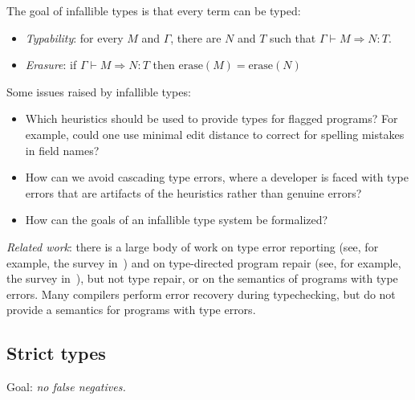 \documentclass[acmsmall]{acmart}
\newcommand{\erase}{\mathrm{erase}}
\begin{document}
The goal of infallible types is that every term can be typed:
\begin{itemize}
\item \emph{Typability}: for every $M$ and $\Gamma$,
  there are $N$ and $T$ such that $\Gamma \vdash M \Rightarrow N : T$.
\item \emph{Erasure}: if $\Gamma \vdash M \Rightarrow N : T$
  then $\erase(M) = \erase(N)$ 
\end{itemize}
Some issues raised by infallible types:
\begin{itemize}
\item Which heuristics should be used to provide types for flagged programs? For example, could one
  use minimal edit distance to correct for spelling mistakes in field names?
\item How can we avoid cascading type errors, where a developer is
  faced with type errors that are artifacts of the heuristics rather
  than genuine errors?
\item How can the goals of an infallible type system be formalized?
\end{itemize}
\emph{Related work}:
there is a large body of work on type error reporting
(see, for example, the survey in~\cite[Ch.~3]{TopQuality})
and on type-directed program repair
(see, for example, the survey in~\cite[Ch.~3]{RepairingTypeErrors}),
but not type repair, or on
the semantics of programs with type errors. Many compilers perform
error recovery during typechecking, but do not provide a semantics
for programs with type errors.

\subsection{Strict types}

Goal: \emph{no false negatives.}
\end{document}
